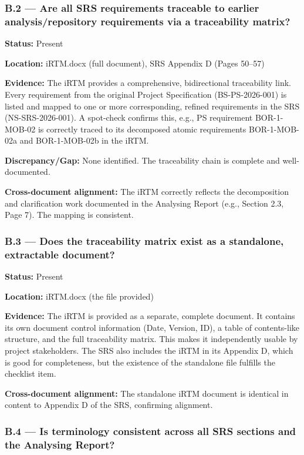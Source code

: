 \documentclass[11pt,a4paper]{article}
\begin{document}
\subsubsection*{B.2 --- Are all SRS requirements traceable to earlier analysis/repository requirements via a traceability matrix?}

\textbf{Status:} Present

\textbf{Location:} iRTM.docx (full document), SRS Appendix D (Pages 50--57)

\textbf{Evidence:} The iRTM provides a comprehensive, bidirectional traceability link. Every requirement from the original Project Specification (BS-PS-2026-001) is listed and mapped to one or more corresponding, refined requirements in the SRS (NS-SRS-2026-001). A spot-check confirms this, e.g., PS requirement BOR-1-MOB-02 is correctly traced to its decomposed atomic requirements BOR-1-MOB-02a and BOR-1-MOB-02b in the iRTM.

\textbf{Discrepancy/Gap:} None identified. The traceability chain is complete and well-documented.

\textbf{Cross-document alignment:} The iRTM correctly reflects the decomposition and clarification work documented in the Analysing Report (e.g., Section 2.3, Page 7). The mapping is consistent.

\subsubsection*{B.3 --- Does the traceability matrix exist as a standalone, extractable document?}

\textbf{Status:} Present

\textbf{Location:} iRTM.docx (the file provided)

\textbf{Evidence:} The iRTM is provided as a separate, complete document. It contains its own document control information (Date, Version, ID), a table of contents-like structure, and the full traceability matrix. This makes it independently usable by project stakeholders. The SRS also includes the iRTM in its Appendix D, which is good for completeness, but the existence of the standalone file fulfills the checklist item.

\textbf{Cross-document alignment:} The standalone iRTM document is identical in content to Appendix D of the SRS, confirming alignment.

\subsubsection*{B.4 --- Is terminology consistent across all SRS sections and the Analysing Report?}
\end{document}
